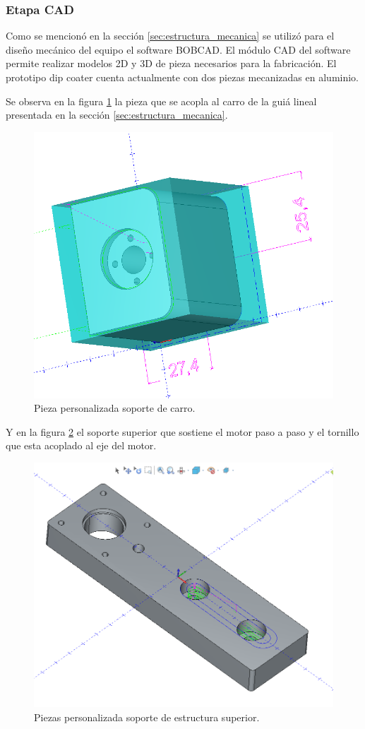 \subsubsection{Etapa CAD}

Como se mencionó en la sección \ref{sec:estructura_mecanica} se utilizó para el diseño mecánico del equipo el software BOBCAD. El módulo CAD del software permite realizar modelos 2D y 3D de pieza necesarios para la fabricación.
El prototipo dip coater cuenta actualmente con dos piezas mecanizadas en aluminio.
 
Se observa en la figura \ref{fig:carro} la pieza que se acopla al carro de la guiá lineal presentada en la sección \ref{sec:estructura_mecanica}.

\begin{figure}[ht]
	\centering
	\includegraphics[width=.5\textwidth]{./Figures/3d_carro.png}
	\caption{Pieza personalizada soporte de carro.}
	\label{fig:carro}
\end{figure}

Y en la figura \ref{fig:estructura_superior} el soporte superior que sostiene el motor paso a paso y el  tornillo que esta acoplado al eje del motor.

\begin{figure}[h]
	\centering
	\includegraphics[width=.5\textwidth]{./Figures/3d_top.png}
	\caption{Piezas personalizada soporte de estructura superior.}
	\label{fig:estructura_superior}
\end{figure}

